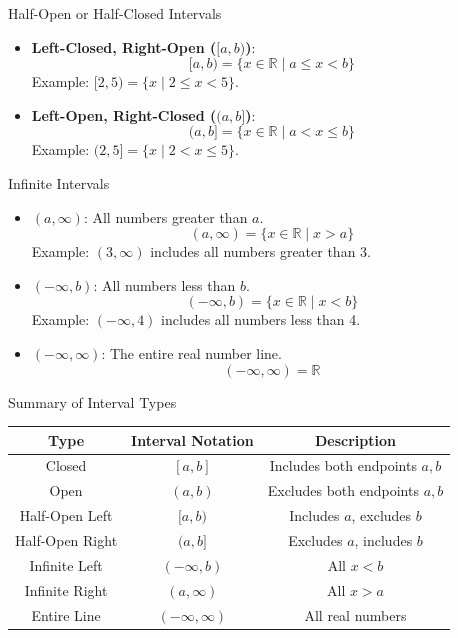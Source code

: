 \documentclass{beamer}
\begin{document}
\begin{frame}{Half-Open or Half-Closed Intervals}
  \begin{itemize}
      \item \textbf{Left-Closed, Right-Open (\([a, b)\))}:
      \[
      [a, b) = \{x \in \mathbb{R} \mid a \leq x < b\}
      \]
      Example: \([2, 5) = \{x \mid 2 \leq x < 5\}\).
      \vspace{5pt}

      \item \textbf{Left-Open, Right-Closed (\((a, b]\))}:
      \[
      (a, b] = \{x \in \mathbb{R} \mid a < x \leq b\}
      \]
      Example: \((2, 5] = \{x \mid 2 < x \leq 5\}\).
  \end{itemize}
\end{frame}
\begin{frame}{Infinite Intervals}
  \begin{itemize}
      \item \((a, \infty)\): All numbers greater than \(a\).
      \[
      (a, \infty) = \{x \in \mathbb{R} \mid x > a\}
      \]
      Example: \((3, \infty)\) includes all numbers greater than 3.

      \item \((-\infty, b)\): All numbers less than \(b\).
      \[
      (-\infty, b) = \{x \in \mathbb{R} \mid x < b\}
      \]
      Example: \((-\infty, 4)\) includes all numbers less than 4.

      \item \((-\infty, \infty)\): The entire real number line.
      \[
      (-\infty, \infty) = \mathbb{R}
      \]
  \end{itemize}
\end{frame}
\begin{frame}{Summary of Interval Types}
  \begin{tabular}{|c|c|c|}
      \hline
      \textbf{Type} & \textbf{Interval Notation} & \textbf{Description} \\
      \hline
      Closed         & \([a, b]\)      & Includes both endpoints \(a, b\) \\
      Open           & \((a, b)\)      & Excludes both endpoints \(a, b\) \\
      Half-Open Left & \([a, b)\)      & Includes \(a\), excludes \(b\) \\
      Half-Open Right & \((a, b]\)     & Excludes \(a\), includes \(b\) \\
      Infinite Left  & \((-\infty, b)\)& All \(x < b\) \\
      Infinite Right & \((a, \infty)\) & All \(x > a\) \\
      Entire Line    & \((-\infty, \infty)\) & All real numbers \\
      \hline
  \end{tabular}
\end{frame}
\end{document}
